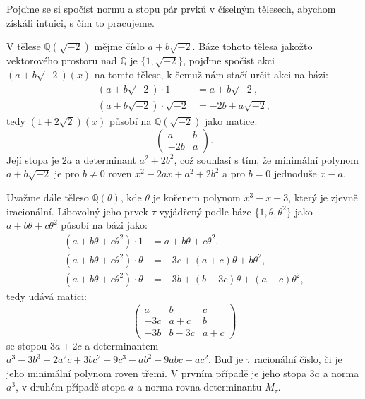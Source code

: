 \documentclass[12pt]{report}
\begin{document}
Pojďme se si spočíst normu a stopu pár prvků v číselným tělesech, abychom získáli intuici, s čím to pracujeme.

\begin{priklad}
V tělese $\mathbb{Q}(\sqrt{-2})$ mějme číslo $a+b\sqrt{-2}$. Báze tohoto tělesa jakožto vektorového prostoru nad $\mathbb{Q}$ je $\lbrace 1,\sqrt{-2}\rbrace$, pojďme spočíst akci $(a+b\sqrt{-2})(x)$ na tomto tělese, k čemuž nám stačí určit akci na bázi:
\begin{align*}
(a+b\sqrt{-2}) \cdot 1 &= a + b \sqrt{-2},\\
(a+b\sqrt{-2}) \cdot \sqrt{-2} &= -2b + a\sqrt{-2},
\end{align*}
tedy $(1+2\sqrt{2})(x)$ působí na $\mathbb{Q}(\sqrt{-2})$ jako matice:
\begin{equation*}
\begin{pmatrix}
a & b\\
-2b & a 
\end{pmatrix}.
\end{equation*}    
Její stopa je $2a$ a determinant $a^2+2b^2$, což souhlasí s tím, že minimální polynom $a+b\sqrt{-2}$ je pro $b \neq 0$ roven $x^2 - 2ax + a^2+2b^2$ a pro $b=0$ jednoduše $x-a$.

Uvažme dále těleso $\mathbb{Q}(\theta)$, kde $\theta$ je kořenem polynom $x^3 - x + 3$, který je zjevně iracionální. Libovolný jeho prvek $\tau$ vyjádřený podle báze $\lbrace 1,\theta,\theta^2 \rbrace$ jako $a + b\theta + c \theta^2$ působí na bázi jako:
\begin{align*}
(a + b\theta + c \theta^2) \cdot 1 &= a + b\theta + c \theta^2,\\
(a + b\theta + c \theta^2) \cdot \theta &=  -3c + (a+c)\theta + b \theta^2,\\
(a + b\theta + c \theta^2) \cdot \theta &=  -3b + (b-3c)\theta + (a+c) \theta^2,
\end{align*}
tedy udává matici:
\begin{equation*}
\begin{pmatrix}
a & b & c\\
-3c & a+c & b\\
-3b & b-3c & a+c 
\end{pmatrix}
\end{equation*} 
se stopou $3a+2c$ a determinantem $ a^3 - 3 b^3 + 2 a^2 c + 3 b c^2 + 9 c^3 - ab^2 - 9 ab c - ac^2$. Buď je $\tau$ racionální číslo, či je jeho minimální polynom roven třemi. V prvním případě je jeho stopa $3a$ a norma $a^3$, v druhém případě stopa $a$ a norma rovna determinantu $M_\tau$.
\end{priklad}
\end{document}
